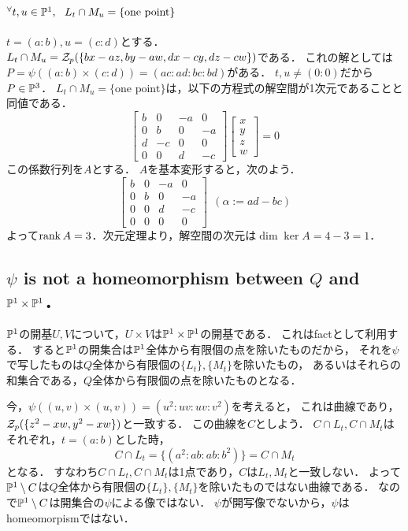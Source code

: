 \documentclass[a4paper]{jarticle}
\begin{document}
    \paragraph{${}^{\forall} t,u \in \mathbb{P}^1,~~ L_t \cap M_u = \{\mbox{one point}\}$}
    $t=(a:b), u=(c:d)$とする．
    $L_t \cap M_u=\mathcal{Z}_p(\{bx-az, by-aw, dx-cy, dz-cw\})$である．
    これの解としては$P=\psi((a:b) \times (c:d))=(ac:ad:bc:bd)$がある．
    $t,u \neq (0:0)$だから$P \in \mathbb{P}^3$．
    $L_t \cap M_u = \{\mbox{one point}\}$は，以下の方程式の解空間が1次元であることと同値である．
    \[
        \begin{bmatrix}
            b & 0 & -a & 0 \\
            0 & b & 0 & -a \\
            d & -c & 0 & 0 \\
            0 & 0 & d & -c
        \end{bmatrix}
        \begin{bmatrix}
            x \\ y \\ z \\ w
        \end{bmatrix}
        =0
    \]
    この係数行列を$A$とする．
    $A$を基本変形すると，次のよう．
    \[
        \begin{bmatrix}
            b & 0 & -a & 0 \\
            0 & b & 0 & -a \\
            0 & 0 & d & -c \\
            0 & 0 & 0 & 0
        \end{bmatrix}
        ~~(\alpha:=ad-bc)
    \]
    よって$\operatorname{rank} A=3$．次元定理より，解空間の次元は$\dim \ker A=4-3=1$．

    \subsection{$\psi$ is not a homeomorphism between $Q$ and $\mathbb{P}^1 \times \mathbb{P}^1$．}
    $\mathbb{P}^1$の開基$U,V$について，$U \times V$は$\mathbb{P}^1 \times \mathbb{P}^1$の開基である．
    これはfactとして利用する．
    すると$\mathbb{P}^1$の開集合は$\mathbb{P}^1$全体から有限個の点を除いたものだから，
    それを$\psi$で写したものは$Q$全体から有限個の$\{L_t\}, \{M_t\}$を除いたもの，
    あるいはそれらの和集合である，$Q$全体から有限個の点を除いたものとなる．

    今，$\psi((u,v) \times (u,v))=(u^2:uv:uv:v^2)$を考えると，
    これは曲線であり，$\mathcal{Z}_p(\{z^2-xw, y^2-xw\})$と一致する．
    この曲線を$C$としよう．
    $C \cap L_t, C \cap M_t$はそれぞれ，$t=(a:b)$とした時，
    \[ C \cap L_t=\{(a^2:ab:ab:b^2)\}=C \cap M_t \]
    となる．
    すなわち$C \cap L_t, C \cap M_t$は1点であり，$C$は$L_t, M_t$と一致しない．
    よって$\mathbb{P}^1 \setminus C$は$Q$全体から有限個の$\{L_t\}, \{M_t\}$を除いたものではない曲線である．
    なので$\mathbb{P}^1 \setminus C$は開集合の$\psi$による像ではない．
    $\psi$が開写像でないから，$\psi$はhomeomorpismではない．
\end{document}
